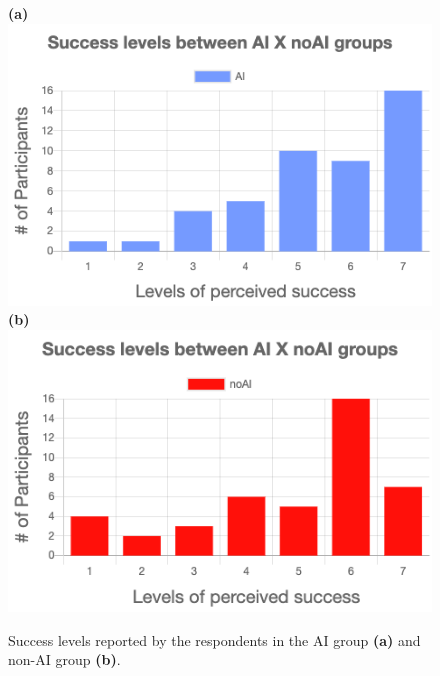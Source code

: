 \documentclass[letterpaper]{article} %
\begin{document}
\begin{figure}[!b]
    \centering \textbf{(a)}
    \includegraphics[width=.99 \columnwidth]{successAI.png}
     \centering\textbf{ (b)}
    \includegraphics[width=.99 \columnwidth]{successNoAi.png}
    \caption{Success levels reported by the respondents in the AI group \textbf{(a)} and non-AI group \textbf{(b)}.}
    \label{fig:success_graph}
\end{figure}
\end{document}
